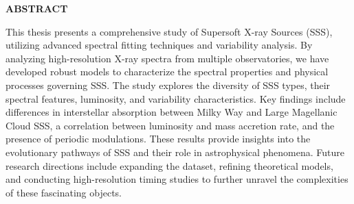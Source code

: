 \begin{titlepage}
    \begin{center}
        {\Large \Large \bf {ABSTRACT} }
    \end{center}
    
    This thesis presents a comprehensive study of Supersoft X-ray Sources (SSS), utilizing advanced spectral fitting techniques and variability analysis. By analyzing high-resolution X-ray spectra from multiple observatories, we have developed robust models to characterize the spectral properties and physical processes governing SSS. The study explores the diversity of SSS types, their spectral features, luminosity, and variability characteristics. Key findings include differences in interstellar absorption between Milky Way and Large Magellanic Cloud SSS, a correlation between luminosity and mass accretion rate, and the presence of periodic modulations. These results provide insights into the evolutionary pathways of SSS and their role in astrophysical phenomena. Future research directions include expanding the dataset, refining theoretical models, and conducting high-resolution timing studies to further unravel the complexities of these fascinating objects.

\end{titlepage}
